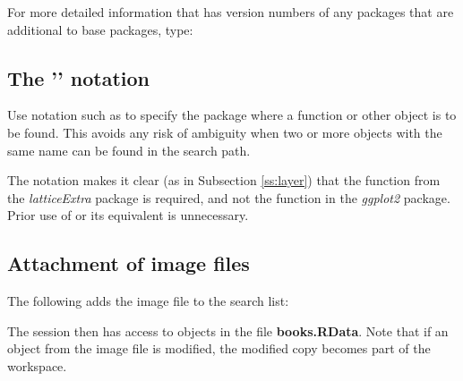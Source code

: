 For more detailed information that has version numbers of any packages
that are additional to base packages, type:
\begin{knitrout}
\color{fgcolor}\begin{kframe}
\begin{alltt}
\hlstd{()}
\end{alltt}
\end{kframe}
\end{knitrout}

\subsection*{The '\txtt{::}' notation}
Use notation such as  to specify the package
where a function or other object is to be found.  This avoids any
risk of ambiguity when two or more objects with the same name can
be found in the search path.

The notation  
makes it clear (as in Subsection \ref{ss:layer}) that the function
 from the {\em latticeExtra} package is required, 
and not the function  in the {\em ggplot2} package.
Prior use of  or its equivalent is
unnecessary.

\subsection*{Attachment of image files}
The following adds the image file  to the search list:
\begin{knitrout}
\color{fgcolor}\begin{kframe}
\begin{alltt}
\hlstd{(}\hlstd{)}
\end{alltt}
\end{kframe}
\end{knitrout}
\noindent
The session then has access to objects in the file
\textbf{books.RData}.
  Note that if an object from the image file is modified,
the modified copy becomes part of the workspace.

